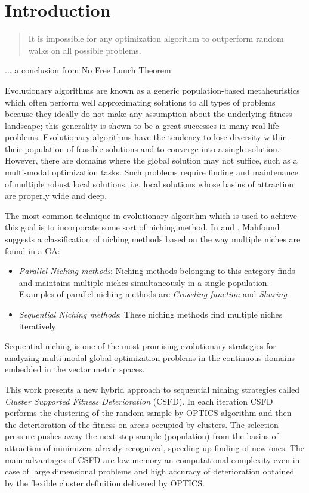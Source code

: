 
\chapter{Introduction}
\label{Introduction} 

\begin{quotation}
 It is impossible for any optimization algorithm to outperform random walks on all possible problems.
\end{quotation}
\begin{flushright}
 ... a conclusion from No Free Lunch Theorem
\end{flushright}

Evolutionary algorithms are known as a generic population-based metaheuristics
which often perform well approximating solutions to all
types of problems because they ideally do not make any assumption about the underlying fitness landscape; 
this generality is shown to be a great successes in many real-life problems.
Evolutionary algorithms have the tendency to lose diversity within
their population of feasible solutions and to converge into a single solution.
However, there are domains where the global solution may not suffice, such
as a multi-modal optimization tasks. 
Such problems require finding and maintenance of multiple robust local
solutions, i.e. local solutions whose basins of attraction are properly wide and deep.

The most common technique in evolutionary algorithm which is
used to achieve this goal is to incorporate some sort of niching method.
In \cite{Mahfound95niching} and \cite{Mahfoud95acomparison}, Mahfound 
suggests a classification of niching methods based on the way multiple niches
are found in a GA:
\begin{itemize}
  \item \textit{Parallel Niching methods}: Niching methods belonging to this
  category finds and maintains multiple niches simultaneously in a single population. 
  Examples of parallel niching methods are \textit{Crowding function} and
  \textit{Sharing}
  \item \textit{Sequential Niching methods}: These niching methods find multiple
  niches iteratively
\end{itemize}
Sequential niching is one of the most promising evolutionary strategies
for analyzing multi-modal global optimization problems in the continuous
domains embedded in the vector metric spaces.

This work presents a new hybrid approach to
sequential niching strategies called \textit{Cluster Supported Fitness
Deterioration} (CSFD).
In each iteration CSFD performs the clustering of the random sample 
by OPTICS algorithm and then the deterioration of the fitness
on areas occupied by clusters. The selection pressure pushes away
the next-step sample (population) from the basins of attraction
of minimizers already recognized, speeding up finding of new ones.
The main advantages of CSFD are low memory an computational complexity
even in case of large dimensional problems and high accuracy
of deterioration obtained by the flexible cluster definition 
delivered by OPTICS.

